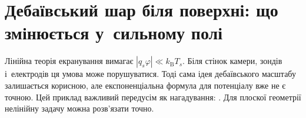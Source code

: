 \section{Дебаївський шар біля поверхні: що змінюється у~сильному полі}\label{sec:debye-layer}



Лінійна теорія екранування вимагає $|q_s\varphi|\ll k_{\mathrm B}T_s$. Біля стінок камери,
зондів і~електродів ця умова може порушуватися. Тоді сама ідея дебаївського масштабу
залишається корисною, але експоненціальна формула для потенціалу вже не є точною. Цей
приклад важливий передусім як нагадування: . Для плоскої геометрії
нелінійну задачу можна розв'язати точно.

